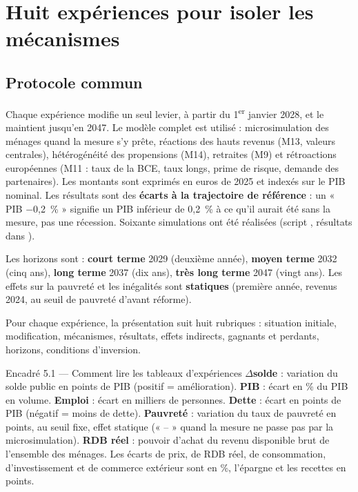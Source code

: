 \chapter{Huit expériences pour isoler les mécanismes}
\label{ch:experiences}

\section{Protocole commun}

Chaque expérience modifie un seul levier, à partir du 1\textsuperscript{er} janvier 2028, et le maintient jusqu'en 2047.
Le modèle complet est utilisé : microsimulation des ménages quand la mesure s'y prête, réactions des hauts revenus
(M13, valeurs centrales), hétérogénéité des propensions (M14), retraites (M9) et rétroactions européennes (M11 : taux
de la BCE, taux longs, prime de risque, demande des partenaires). Les montants sont exprimés en euros de 2025 et
indexés sur le PIB nominal. Les résultats sont des \textbf{écarts à la trajectoire de référence} : un « PIB $-$0,2~\% »
signifie un PIB inférieur de 0,2~\% à ce qu'il aurait été sans la mesure, pas une récession. Soixante simulations ont
été réalisées (script , résultats dans ).

Les horizons sont : \textbf{court terme} 2029 (deuxième année), \textbf{moyen terme} 2032 (cinq ans),
\textbf{long terme} 2037 (dix ans), \textbf{très long terme} 2047 (vingt ans). Les effets sur la pauvreté et les
inégalités sont \textbf{statiques} (première année, revenus 2024, au seuil de pauvreté d'avant réforme).

Pour chaque expérience, la présentation suit huit rubriques : situation initiale, modification, mécanismes,
résultats, effets indirects, gagnants et perdants, horizons, conditions d'inversion.

\begin{encadre}{Encadré 5.1 — Comment lire les tableaux d'expériences}
\textbf{$\Delta$solde} : variation du solde public en points de PIB (positif = amélioration). \textbf{PIB} : écart en
\% du PIB en volume. \textbf{Emploi} : écart en milliers de personnes. \textbf{Dette} : écart en points de PIB
(négatif = moins de dette). \textbf{Pauvreté} : variation du taux de pauvreté en points, au seuil fixe, effet statique
(« -- » quand la mesure ne passe pas par la microsimulation). \textbf{RDB réel} : pouvoir d'achat du revenu disponible
brut de l'ensemble des ménages. Les écarts de prix, de RDB réel, de consommation, d'investissement et de commerce
extérieur sont en \%, l'épargne et les recettes en points.
\end{encadre}

